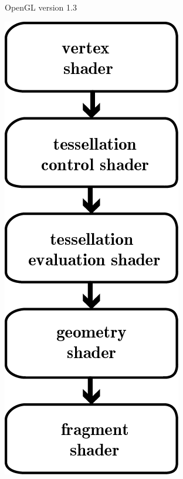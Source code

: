 \begin{figure}
\begin{subfigure}[b]{0.4\columnwidth}
			\caption{OpenGL version 1.3}
			\label{fig:implementation:pipeline:old}
		\end{subfigure}
		\begin{subfigure}[b]{0.4\columnwidth}
			\centering
			\includegraphics[width=\textwidth]{content/img/implementation/pipeline_newOpenGL.png}

\end{subfigure}
\end{figure}
